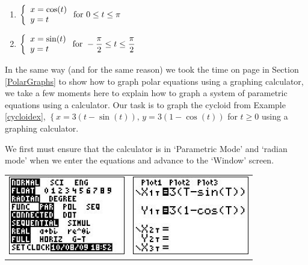 \begin{multicols}{2} \raggedcolumns 
\begin{enumerate}
\setcounter{enumi}{\value{HW}}

\item ${\displaystyle \left\{ \begin{array}{l} x = \cos(t) \\ y = t \end{array} \right. \vspace{.25in} \mbox{for } 0 \leq t \leq \pi}$
\item ${\displaystyle \left\{ \begin{array}{l} x = \sin(t) \\ y = t \end{array} \right. \vspace{.25in} \mbox{for } -\dfrac{\pi}{2} \leq t \leq \dfrac{\pi}{2}}$ \label{paraplotlast}

\setcounter{HW}{\value{enumi}}
\end{enumerate}
\end{multicols}

\newpage

In the same way (and for the same reason) we took the time on page \pageref{polargraphscalculator} in Section \ref{PolarGraphs} to show how to graph polar equations using a graphing calculator, we take a few moments here to explain how to graph a system of parametric equations using a calculator.  Our task is to graph the cycloid from Example \ref{cycloidex},  $\left\{ x = 3(t -\sin(t)), \, y = 3(1-\cos(t)) \right.$ for $t \geq 0$ using a graphing calculator.

\smallskip

We first must ensure that the calculator is in `Parametric Mode' and `radian mode' when we enter the equations and advance to the `Window' screen. 

\begin{center}

\begin{tabular}{cc}

\includegraphics[width=2in]{./ParametricEquationsGraphics/Parametric01.jpg} &
\hspace{0.75in} \includegraphics[width=2in]{./ParametricEquationsGraphics/Parametric02.jpg} \\

\end{tabular} 

\end{center}

